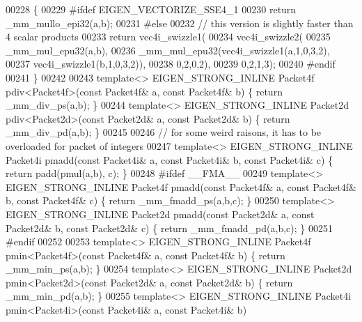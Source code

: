 \begin{DoxyCode}
00228 \{
00229 \textcolor{preprocessor}{#ifdef EIGEN\_VECTORIZE\_SSE4\_1}
00230   \textcolor{keywordflow}{return} \_mm\_mullo\_epi32(a,b);
00231 \textcolor{preprocessor}{#else}
00232   \textcolor{comment}{// this version is slightly faster than 4 scalar products}
00233   \textcolor{keywordflow}{return} vec4i\_swizzle1(
00234             vec4i\_swizzle2(
00235               \_mm\_mul\_epu32(a,b),
00236               \_mm\_mul\_epu32(vec4i\_swizzle1(a,1,0,3,2),
00237                             vec4i\_swizzle1(b,1,0,3,2)),
00238               0,2,0,2),
00239             0,2,1,3);
00240 \textcolor{preprocessor}{#endif}
00241 \}
00242 
00243 \textcolor{keyword}{template}<> EIGEN\_STRONG\_INLINE Packet4f pdiv<Packet4f>(\textcolor{keyword}{const} Packet4f& a, \textcolor{keyword}{const} Packet4f& b) \{ \textcolor{keywordflow}{return} 
      \_mm\_div\_ps(a,b); \}
00244 \textcolor{keyword}{template}<> EIGEN\_STRONG\_INLINE Packet2d pdiv<Packet2d>(\textcolor{keyword}{const} Packet2d& a, \textcolor{keyword}{const} Packet2d& b) \{ \textcolor{keywordflow}{return} 
      \_mm\_div\_pd(a,b); \}
00245 
00246 \textcolor{comment}{// for some weird raisons, it has to be overloaded for packet of integers}
00247 \textcolor{keyword}{template}<> EIGEN\_STRONG\_INLINE Packet4i pmadd(\textcolor{keyword}{const} Packet4i& a, \textcolor{keyword}{const} Packet4i& b, \textcolor{keyword}{const} Packet4i& c) \{ \textcolor{keywordflow}{
      return} padd(pmul(a,b), c); \}
00248 \textcolor{preprocessor}{#ifdef \_\_FMA\_\_}
00249 \textcolor{keyword}{template}<> EIGEN\_STRONG\_INLINE Packet4f pmadd(\textcolor{keyword}{const} Packet4f& a, \textcolor{keyword}{const} Packet4f& b, \textcolor{keyword}{const} Packet4f& c) \{ \textcolor{keywordflow}{
      return} \_mm\_fmadd\_ps(a,b,c); \}
00250 \textcolor{keyword}{template}<> EIGEN\_STRONG\_INLINE Packet2d pmadd(\textcolor{keyword}{const} Packet2d& a, \textcolor{keyword}{const} Packet2d& b, \textcolor{keyword}{const} Packet2d& c) \{ \textcolor{keywordflow}{
      return} \_mm\_fmadd\_pd(a,b,c); \}
00251 \textcolor{preprocessor}{#endif}
00252 
00253 \textcolor{keyword}{template}<> EIGEN\_STRONG\_INLINE Packet4f pmin<Packet4f>(\textcolor{keyword}{const} Packet4f& a, \textcolor{keyword}{const} Packet4f& b) \{ \textcolor{keywordflow}{return} 
      \_mm\_min\_ps(a,b); \}
00254 \textcolor{keyword}{template}<> EIGEN\_STRONG\_INLINE Packet2d pmin<Packet2d>(\textcolor{keyword}{const} Packet2d& a, \textcolor{keyword}{const} Packet2d& b) \{ \textcolor{keywordflow}{return} 
      \_mm\_min\_pd(a,b); \}
00255 \textcolor{keyword}{template}<> EIGEN\_STRONG\_INLINE Packet4i pmin<Packet4i>(\textcolor{keyword}{const} Packet4i& a, \textcolor{keyword}{const} Packet4i& b)

\end{DoxyCode}
